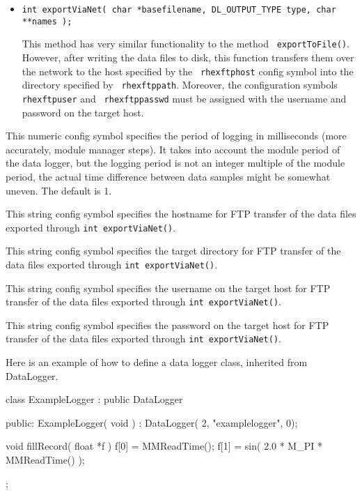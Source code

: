 \begin{itemize}
\item{\tt int exportViaNet( char *basefilename, DL\_OUTPUT\_TYPE type, char
**names );} \par 
This method has very similar functionality to the method {\tt
exportToFile()}. However, after writing the data files to disk, this
function transfers them over the network to the host specified by the {\tt
rhexftphost} config symbol into the directory specified by {\tt
rhexftppath}. Moreover, the configuration symbols {\tt rhexftpuser} and {\tt
rhexftppasswd} must be assigned with the username and password on the target
host.
\end{itemize}

\configsymbols

\begin{itemize}

\par 

This numeric config symbol specifies the period of logging in milliseconds
(more accurately, module manager steps). It takes into account the module
period of the data logger, but the logging period is not an integer multiple
of the module period, the actual time difference between data samples might
be somewhat uneven. The default is 1.

\par
This string config symbol specifies the hostname for FTP transfer of the
data files exported through  {\tt int exportViaNet()}.
\par
This string config symbol specifies the target directory for FTP transfer of
the data files exported through  {\tt int exportViaNet()}.
\par
This string config symbol specifies the username on the target host for FTP
transfer of the data files exported through  {\tt int exportViaNet()}.
\par
This string config symbol specifies the password on the target host for FTP
transfer of the data files exported through  {\tt int exportViaNet()}.
\end{itemize}

\examplecode

Here is an example of how to define a data logger class, inherited from
DataLogger.

\begin{codesegment}
class ExampleLogger : public DataLogger {
  public:
    ExampleLogger( void ) : DataLogger( 2, "examplelogger", 0);

    void fillRecord( float *f ) {
      f[0] = MMReadTime();
      f[1] = sin( 2.0 * M_PI * MMReadTime() );
    }
};
\end{codesegment}

